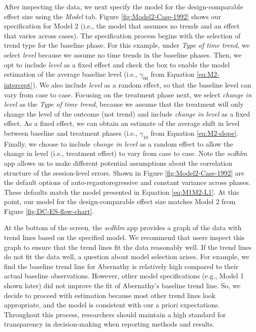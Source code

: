 \documentclass[
]{book}
\begin{document}
After inspecting the data, we next specify the model for the design-comparable effect size using the \emph{Model} tab. Figure \ref{fig:Model2-Case-1992} shows our specification for Model 2 (i.e., the model that assumes no trends and an effect that varies across cases). The specification process begins with the selection of trend type for the baseline phase. For this example, under \emph{Type of time trend}, we select \emph{level} because we assume no time trends in the baseline phases. Then, we opt to include \emph{level} as a fixed effect and check the box to enable the model estimation of the average baseline level (i.e., \(\gamma_{00}\) from Equation \eqref{eq:M2-intercept}).
We also include \emph{level} as a random effect, so that the baseline level can vary from case to case. Focusing on the treatment phase next, we select \emph{change in level} as the \emph{Type of time trend}, because we assume that the treatment will only change the level of the outcome (not trend) and include \emph{change in level} as a fixed effect. As a fixed effect, we can obtain an estimate of the average shift in level between baseline and treatment phases (i.e., \(\gamma_{10}\) from Equation \eqref{eq:M2-slope}.
Finally, we choose to include \emph{change in level} as a random effect to allow the change in level (i.e., treatment effect) to vary from case to case. Note the \emph{scdhlm} app allows us to make different potential assumptions about the correlation structure of the session-level errors. Shown in Figure \ref{fig:Model2-Case-1992} are the default options of auto-regautoregressive and constant variance across phases. These defaults match the model presented in Equation \eqref{eq:M1M2-L1}. At this point, our model for the design-comparable effect size matches Model 2 from Figure \ref{fig:DC-ES-flow-chart}.

At the bottom of the screen, the \emph{scdhlm} app provides a graph of the data with trend lines based on the specified model. We recommend that users inspect this graph to ensure that the trend lines fit the data reasonably well. If the trend lines do not fit the data well, a question about model selection arises. For example, we find the baseline trend line for Abernathy is relatively high compared to their actual baseline observations. However, other model specifications (e.g., Model 1 shown later) did not improve the fit of Abernathy's baseline trend line. So, we decide to proceed with estimation because most other trend lines look appropriate, and the model is consistent with our a priori expectations. Throughout this process, researchers should maintain a high standard for transparency in decision-making when reporting methods and results.
\end{document}
